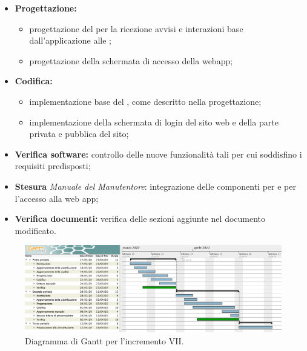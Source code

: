 					\begin{itemize}
						\item \textbf{Progettazione:} 
						\begin{itemize}
							\item progettazione del  per la ricezione avvisi e interazioni base dall'applicazione alle ; 
							\item progettazione della schermata di accesso della webapp;
						\end{itemize}
						\item \textbf{Codifica:} 
						\begin{itemize}
							\item implementazione base del , come descritto nella progettazione; 
							\item implementazione della schermata di login del sito web e della parte privata e pubblica del sito;
						\end{itemize}
						\item \textbf{Verifica software:} controllo delle nuove funzionalità tali per cui soddisfino i requisiti predisposti;
						\item \textbf{Stesura} \textit{Manuale del Manutentore}: integrazione delle componenti per  e per l'accesso alla web app;
						\item \textbf{Verifica documenti:} verifica delle sezioni aggiunte nel documento modificato.
					\end{itemize} 			

		\begin{landscape}
          \begin{figure}[H]
            \centering
            \includegraphics[width=\linewidth]{images/ganttDettaglioCodifica} %
            \caption{Diagramma di Gantt per l'incremento VII.}
          \end{figure}		
		\end{landscape}


